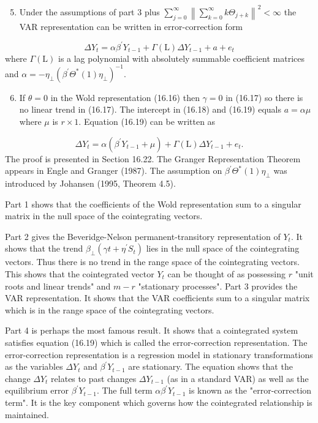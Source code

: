 \documentclass[10pt]{article}
\begin{document}
\begin{enumerate}
  \setcounter{enumi}{4}
  \item Under the assumptions of part 3 plus $\sum_{j=0}^{\infty}\left\|\sum_{k=0}^{\infty} k \Theta_{j+k}\right\|^{2}<\infty$ the VAR representation can be written in error-correction form
\end{enumerate}
$$
\Delta Y_{t}=\alpha \beta^{\prime} Y_{t-1}+\Gamma(\mathrm{L}) \Delta Y_{t-1}+a+e_{t}
$$
where $\Gamma(\mathrm{L})$ is a lag polynomial with absolutely summable coefficient matrices and $\alpha=-\eta_{\perp}\left(\beta^{\prime} \Theta^{*}(1) \eta_{\perp}\right)^{-1}$.

\begin{enumerate}
  \setcounter{enumi}{5}
  \item If $\theta=0$ in the Wold representation (16.16) then $\gamma=0$ in (16.17) so there is no linear trend in (16.17). The intercept in (16.18) and (16.19) equals $a=\alpha \mu$ where $\mu$ is $r \times 1$. Equation (16.19) can be written as
\end{enumerate}
$$
\Delta Y_{t}=\alpha\left(\beta^{\prime} Y_{t-1}+\mu\right)+\Gamma(\mathrm{L}) \Delta Y_{t-1}+e_{t} .
$$
The proof is presented in Section 16.22. The Granger Representation Theorem appears in Engle and Granger (1987). The assumption on $\beta^{\prime} \Theta^{*}(1) \eta_{\perp}$ was introduced by Johansen (1995, Theorem 4.5).

Part 1 shows that the coefficients of the Wold representation sum to a singular matrix in the null space of the cointegrating vectors.

Part 2 gives the Beveridge-Nelson permanent-transitory representation of $Y_{t}$. It shows that the trend $\beta_{\perp}\left(\gamma t+\eta^{\prime} S_{t}\right)$ lies in the null space of the cointegrating vectors. Thus there is no trend in the range space of the cointegrating vectors. This shows that the cointegrated vector $Y_{t}$ can be thought of as possessing $r$ "unit roots and linear trends" and $m-r$ "stationary processes". Part 3 provides the VAR representation. It shows that the VAR coefficients sum to a singular matrix which is in the range space of the cointegrating vectors.

Part 4 is perhaps the most famous result. It shows that a cointegrated system satisfies equation (16.19) which is called the error-correction representation. The error-correction representation is a regression model in stationary transformations as the variables $\Delta Y_{t}$ and $\beta^{\prime} Y_{t-1}$ are stationary. The equation shows that the change $\Delta Y_{t}$ relates to past changes $\Delta Y_{t-1}$ (as in a standard VAR) as well as the equilibrium error $\beta^{\prime} Y_{t-1}$. The full term $\alpha \beta^{\prime} Y_{t-1}$ is known as the "error-correction term". It is the key component which governs how the cointegrated relationship is maintained.
\end{document}
